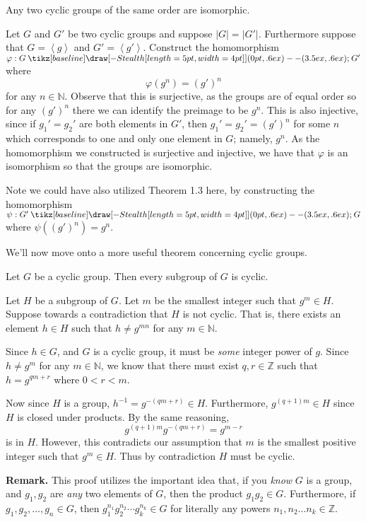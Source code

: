 \documentclass[12pt,letterpaper]{algebra_book}
\renewcommand{\to}{\mathbin{\tikz[baseline] \draw[-{Stealth[length=5pt,width=4pt]}] (0pt,.6ex) -- (3.5ex,.6ex);}}
\renewcommand{\phi}{\varphi}
\theoremstyle{definition}
\begin{document}
    \begin{thm}
        Any two cyclic groups of the same order are isomorphic.
    \end{thm}

    \begin{prf}
        Let $G$ and $G'$ be two cyclic groups and suppose $|G| =
        |G'|$. Furthermore suppose that $G = \left< g\right>$ and $G'
        = \left< g' \right>$. Construct the homomorphism $\phi: G \to
        G'$ where 
        \[
            \phi(g^n) = (g')^n
        \]
        for any $n \in \mathbb{N}$. Observe that this is surjective, as
        the groups are of equal order so for any $(g')^n$ there we can
        identify the preimage to be $g^n$. This is also injective,
        since if $g_1' = g_2'$ are both elements in $G'$, then $g_1' =
        g_2' = (g')^n$ for some $n$ which corresponds to one and only
        one element in $G$; namely, $g^n$.
        As the homomorphism we constructed is surjective and
        injective, we have that $\phi$ is an isomorphism so that the
        groups are isomorphic.

        Note we could have also utilized Theorem 1.3 here, by constructing
        the homomorphism $\psi: G' \to G$ where $\psi((g')^n) = g^n$.

    \end{prf}

    We'll now move onto a more useful theorem concerning cyclic groups.

    \begin{thm}
        Let $G$ be a cyclic group. Then every subgroup of $G$ is cyclic.
    \end{thm}

    \begin{prf}
        Let $H$ be a subgroup of $G$.
        Let $m$ be the smallest integer such that $g^m \in H$. Suppose
        towards a contradiction that $H$ is not cyclic. That is, there
        exists an element $h \in H$ such that $h \ne g^{mn}$ for any
        $m \in \mathbb{N}$. 
        
        Since $h \in G$, and $G$ is a cyclic group, it must be \textit{some}
        integer power of $g$. Since $h \ne g^m$ for any $m \in
        \mathbb{N}$, 
        we know that
        there must exist $q, r \in \mathbb{Z}$ such that $h
        = g^{qm + r}$ where $0 < r < m$. 

        Now since $H$ is a group, $h^{-1} = g^{-(qm + r)} \in H$.
        Furthermore, $g^{(q+1)m} \in H$ since $H$ is closed under
        products. By the same reasoning,
        \[
            g^{(q+1)m}g^{-(qm + r)} = g^{m-r}
        \]
        is in $H$. However, this contradicts our assumption that $m$
        is the smallest positive integer such that $g^m \in H$. Thus
        by contradiction $H$ must be cyclic. 
    \end{prf}
    \textbf{Remark.}
    This proof utilizes the important idea that, if you \textit{know} $G$ is
    a group, and $g_1, g_2$ are \textit{any} two elements of $G$, then
    the product $g_1g_2 \in G$. Furthermore, if $g_1, g_2, \dots, g_n
    \in G$, then $g_1^{n_1}g_2^{n_2}\cdots g_k^{n_k} \in G$ for
    literally any powers $n_1, n_2 \dots n_k \in \mathbb{Z}$. 
    
\end{document}
